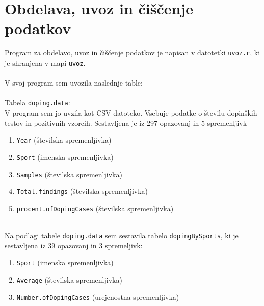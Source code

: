 \documentclass[11pt,a4paper]{article}
\begin{document}
\newpage

\section{Obdelava, uvoz in čiščenje podatkov}

Program za obdelavo, uvoz in čiščenje podatkov je napisan v datotetki \verb|uvoz.r|, ki je shranjena v mapi \verb|uvoz|.
\\
\\
V svoj program sem uvozila naslednje table:
\\
\\
Tabela \verb|doping.data|:
\\
V program sem jo uvzila kot CSV datoteko. Vsebuje podatke o številu dopinških testov in pozitivnih vzorcih.
Sestavljena je iz 297 opazovanj in 5 spremenljivk
\begin{enumerate}
\item{\verb|Year| (številska spremenljivka)}
\item{\verb|Sport| (imenska spremenljivka)}
\item{\verb|Samples| (številska spremenljivka)}
\item{\verb|Total.findings| (številska spremenljivka)}
\item{\verb|procent.ofDopingCases| (številska spremenljivka)}

\end{enumerate}

\
\\
Na podlagi tabele \verb|doping.data| sem sestavila tabelo \verb|dopingBySports|, ki je sestavljena iz 39 opazovanj in 3 spremeljivk:
\begin{enumerate}

\item{\verb|Sport| (imenska spremenljivka)}
\item{\verb|Average| (številska spremenljivka)}
\item{\verb|Number.ofDopingCases| (urejenostna spremenljivka)}


\end{enumerate}
\end{document}

